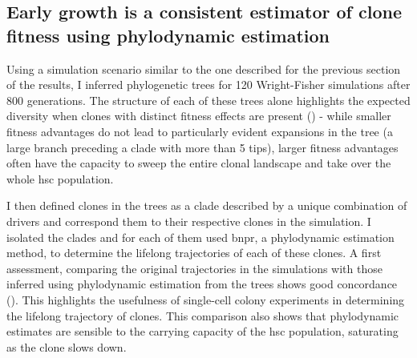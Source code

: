 \begin{figure}[h]
	\label{fig:beta-distance-fit}
\end{figure}


\FloatBarrier

\subsection{Early growth is a consistent estimator of clone fitness using phylodynamic estimation}

Using a simulation scenario similar to the one described for the previous section of the results, I inferred phylogenetic trees for 120 Wright-Fisher simulations after 800 generations. The structure of each of these trees alone highlights the expected diversity when clones with distinct fitness effects are present () - while smaller fitness advantages do not lead to particularly evident expansions in the tree (a large branch preceding a clade with more than 5 tips), larger fitness advantages often have the capacity to sweep the entire clonal landscape and take over the whole \ac{hsc} population. 

\begin{figure}[h]
	\label{fig:trees-simulated-examples}
\end{figure}

I then defined clones in the trees as a clade described by a unique combination of drivers and correspond them to their respective clones in the simulation. I isolated the clades and for each of them used \ac{bnpr}, a phylodynamic estimation method, to determine the lifelong trajectories of each of these clones. A first assessment, comparing the original trajectories in the simulations with those inferred using phylodynamic estimation from the trees shows good concordance (). This highlights the usefulness of single-cell colony experiments in determining the lifelong trajectory of clones. This comparison also shows that phylodynamic estimates are sensible to the carrying capacity of the \ac{hsc} population, saturating as the clone slows down. 

